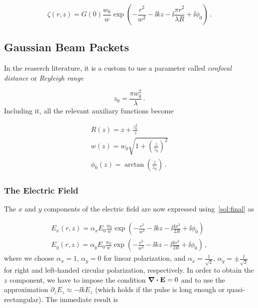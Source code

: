 \documentclass[12pt, class=report, crop=false]{standalone}
\begin{document}
\begin{equation}
  \label{sol:final}
  \zeta(r,z) = G(0)\frac{w_0}{w} \exp(-\frac{r^2}{w^2}  -\ii k z -\ii \frac{\pi r^2}{\lambda R} + \ii \phi_0)\,.
\end{equation}

\subsection{Gaussian Beam Packets}

In the reaserch literature, it is a custom to use a parameter called \textit{confocal distance} or \textit{Reyleigh range}

\begin{equation}
  z_0=\frac{\pi w_0^2}{\lambda} \,.
\end{equation}
Including it, all the relevant auxiliary functions become

\begin{subequations}
  \begin{align}
    R(z) = z+\frac{z_0^2}{z} \\
    w(z) = w_0 \sqrt{1+\left( \frac{z}{z_0}\right)^2}\\
    \phi_0 (z) = \arctan(\frac{z}{z_0}) \,.
  \end{align}
\end{subequations}

\subsubsection{The Electric Field}
The \(x\) and \(y\) components of the electric field are now expressed using~\cref{sol:final} as

\begin{subequations}
  \begin{align}
    E_x (r,z) = \alpha_x E_0 \frac{w_0}{w} \exp(-\frac{r^2}{w^2}  -\ii k z -\ii \frac{k r^2}{2 R} + \ii \phi_0)\\
    E_y (r,z) = \alpha_y E_0 \frac{w_0}{w} \exp(-\frac{r^2}{w^2}  -\ii k z -\ii \frac{k r^2}{2 R} + \ii \phi_0)\,,
  \end{align}
\end{subequations}
where we choose \(\alpha_x=1\), \(\alpha_y=0\) for linear polarization, and \(\alpha_x=\frac{1}{\sqrt{2}}\), \(\alpha_y=\pm \frac{\ii}{\sqrt{2}}\) for right and left-handed circular polarization, respectively. In order to obtain the \(z\) component, we have to impose the condition \(\div{\vb{E}} = 0\) and to use the approximation \(\partial_z E_z \approx -\ii k E_z\) (which holds if the pulse is long enough or quasi-rectangular). The immediate result is
\end{document}
